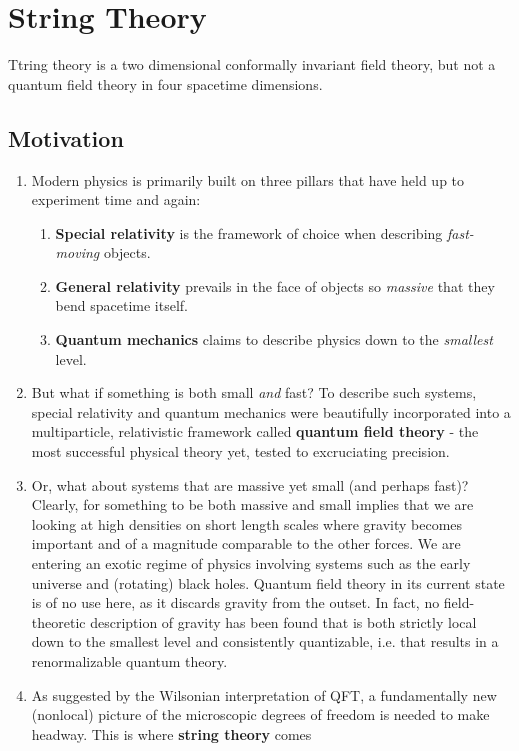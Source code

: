 \chapter{String Theory}
Ttring theory is a two dimensional conformally invariant field
theory, but not a quantum field theory in four spacetime dimensions.
\section{Motivation}
\begin{enumerate}
	\item Modern physics is primarily built on three pillars that have held up to experiment time and again:
	\begin{enumerate} 
	\item \textbf{Special relativity} is the framework of choice when describing \emph{fast-moving} objects.
	\item  \textbf{General relativity} prevails in the face of objects so \emph{massive} that they bend spacetime itself.
	\item  \textbf{Quantum mechanics} claims to describe physics down to the \emph{smallest} level.
	\end{enumerate} 
	\item  But what if something is both small \emph{and} fast? To describe such systems, special relativity and
	quantum mechanics were beautifully incorporated into a multiparticle, relativistic framework called
	\textbf{quantum field theory} - the most successful physical theory yet, tested to excruciating precision.
	\item Or, what about systems that are massive yet small (and perhaps fast)? Clearly, for something to be
	both massive and small implies that we are looking at high densities on short length scales where
	gravity becomes important and of a magnitude comparable to the other forces. We are entering
	an exotic regime of physics involving systems such as the early universe and (rotating) black holes.
	Quantum field theory in its current state is of no use here, as it discards gravity from the outset. In
	fact, no field-theoretic description of gravity has been found that is both strictly local down to the
	smallest level and consistently quantizable, i.e. that results in a renormalizable quantum theory.
	\item As suggested by the Wilsonian interpretation of QFT, a fundamentally new (nonlocal) picture of
	the microscopic degrees of freedom is needed to make headway. This is where \textbf{string theory} comes

\end{enumerate}
